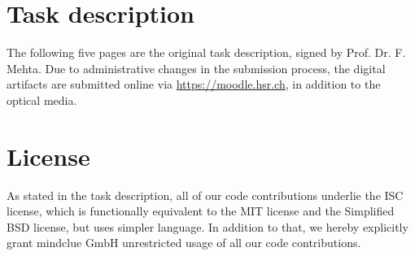 \documentclass[a4paper]{report}
\begin{document}
\chapter{Task description}\label{ch:task-desc}
The following five pages are the original task description, signed by Prof. Dr.
F. Mehta. Due to administrative changes in the submission process, the digital
artifacts are submitted online via \url{https://moodle.hsr.ch}, in addition to
the optical media.




\chapter{License}
As stated in the task description, all of our code contributions underlie the
ISC license, which is functionally equivalent to the MIT license and the
Simplified BSD license, but uses simpler language. In addition to that, we
hereby explicitly grant mindclue GmbH unrestricted usage of all our code
contributions.







\end{document}
